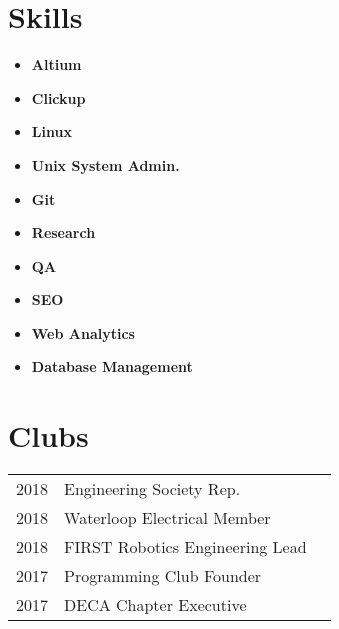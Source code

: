 \documentclass[]{chandan-cv}
\begin{document}
\begin{minipage}[t]{0.33\textwidth}
\section{Skills}
	\begin{itemize}
		\setlength\itemsep{0em}
		\item \textbf{Altium}
		\item \textbf{Clickup}
		\item \textbf{Linux}
		\item \textbf{Unix System Admin.}
		\item \textbf{Git}
		\item \textbf{Research}
		\item \textbf{QA}
		\item \textbf{SEO}
		\item \textbf{Web Analytics}
		\item \textbf{Database Management}
	\end{itemize}
\sectionsep


\section{Clubs} 
\begin{tabular}{rll}
2018		&	Engineering Society Rep.\\
2018		&	Waterloop Electrical Member\\
2018		&	FIRST Robotics Engineering Lead\\
2017		&	Programming Club Founder\\
2017		&	DECA Chapter Executive\\
\end{tabular}
\sectionsep


%
%
%
%
%
%
%

\end{minipage} 
\end{document}
